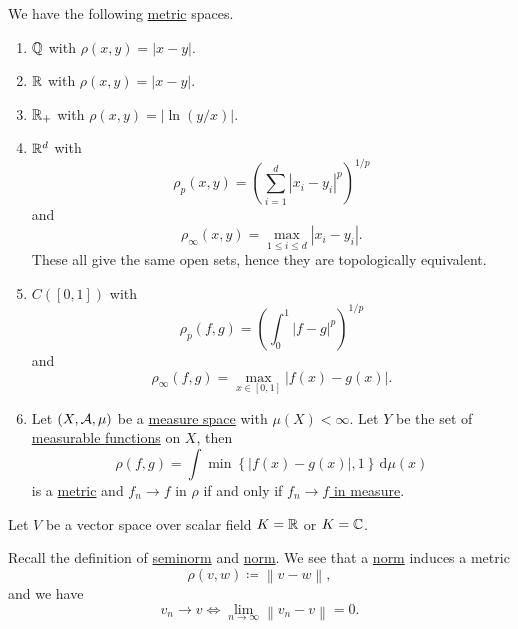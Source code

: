 \begin{eg}
	We have the following \hyperref[def:metric]{metric} spaces.
	\begin{enumerate}
		\item \(\mathbb{\MakeUppercase{q}}\) with \(\rho (x, y) = \left\vert x - y \right\vert \).
		\item \(\mathbb{\MakeUppercase{r}}\) with \(\rho (x, y) = \left\vert x - y \right\vert \).
		\item \(\mathbb{\MakeUppercase{r}}_+\) with \(\rho (x, y) = \left\vert \ln (y / x)\right\vert \).
		\item \(\mathbb{\MakeUppercase{r}}^d\) with
		      \[
			      \rho _p(x, y) = \left(\sum\limits_{i=1}^{d} \left\vert x_{i} - y_{i} \right\vert^p \right)^{1 / p}
		      \]
		      and
		      \[
			      \rho _\infty (x, y ) = \mathop{\max} _{1\leq i\leq d}\left\vert x_{i} - y_{i} \right\vert.
		      \]
		      These all give the same open sets, hence they are topologically equivalent.
		\item \(C([0, 1])\) with
		      \[
			      \rho _p(f, g) = \left(\int _0^1 \left\vert f-g \right\vert^p \right)^{1 / p}
		      \]
		      and
		      \[
			      \rho _\infty (f, g) = \mathop{\max} _{x\in[0, 1]}\left\vert f(x) - g(x) \right\vert.
		      \]
		\item Let \((X, \mathcal{\MakeUppercase{a}} , \mu )\) be a \hyperref[def:measure-space]{measure space} with \(\mu (X)< \infty \). Let \(Y\) be the set of
		      \hyperref[def:measurable-function]{measurable functions} on \(X\), then
		      \[
			      \rho (f, g) = \int \mathop{\min} \left\{\left\vert f(x) - g(x) \right\vert, 1 \right\}\,\mathrm{d} \mu (x)
		      \]
		      is a \hyperref[def:metric]{metric} and \(f_{n} \to f\) in \(\rho\) if and only if \hyperref[def:converge-in-measure]{\(f_n \to f\) in measure}.
	\end{enumerate}
\end{eg}

Let \(V\) be a vector space over scalar field \(K = \mathbb{\MakeUppercase{r}} \) or \(K = \mathbb{\MakeUppercase{c}} \).
\begin{prev}\label{induced-metric}
	Recall the definition of \hyperref[def:seminorm]{seminorm} and \hyperref[def:norm]{norm}. We see that a \hyperref[def:norm]{norm} induces a metric
	\[
		\rho (v, w) \coloneqq \left\lVert v - w\right\rVert,
	\]
	and we have
	\[
		v_{n} \to v \iff \lim\limits_{n \to \infty} \left\lVert v_{n} - v\right\rVert = 0.
	\]
\end{prev}

